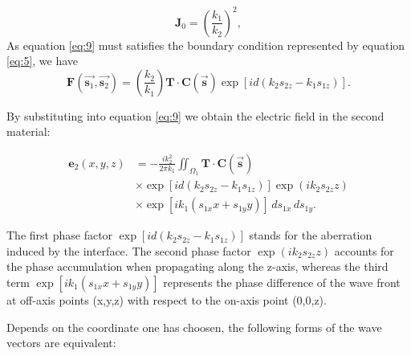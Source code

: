 \documentclass[9pt,twocolumn,twoside]{osajnl}
\begin{document}
\begin{equation}\label{eq:10}
	\mathbf{J}_0=(\frac{k_1}{k_2})^2,
\end{equation}
As equation \eqref{eq:9} must satisfies the boundary condition represented by equation \eqref{eq:5}, we have
\begin{equation}\label{eq:11}
	\mathbf{F}(\vec{\mathbf{s}_1},\vec{\mathbf{s}_2})=(\frac{k_2}{k_1})\mathbf{T}\cdot\mathbf{C}(\vec{\mathbf{s}})\exp[id(k_2s_{2z}-k_1s_{1z})].
\end{equation}

By substituting into equation \eqref{eq:9} we obtain the electric field in the second material:

\begin{equation}
	\begin{aligned}\label{eq:12}
	\mathbf{e}_2(x,y,z)&=-\frac{ik^2_2}{2\pi k_1}\iint_{\Omega_1}\mathbf{T}\cdot\mathbf{C}(\vec{\mathbf{s}})\\
	&\times\exp[id(k_2s_{2z}-k_1s_{1z})]\exp(ik_2s_{2z}z)\\
	&\times\exp[ik_1(s_{1x}x+s_{1y}y)]\,ds_{1x}\,ds_{1y}.
	\end{aligned}
\end{equation}

The first phase factor $\exp[id(k_2s_{2z}-k_1s_{1z})]$ stands for the aberration induced by the interface. The second phase factor $\exp(ik_2s_{2z}z)$ accounts for the phase accumulation when propagating along the z-axis, whereas the third term $\exp[ik_1(s_{1x}x+s_{1y}y)]$ represents the phase difference of the wave front at off-axis points (x,y,z) with respect to the on-axis point (0,0,z).

Depends on the coordinate one has choosen, the following forms of the wave vectors are equivalent:
\end{document}
